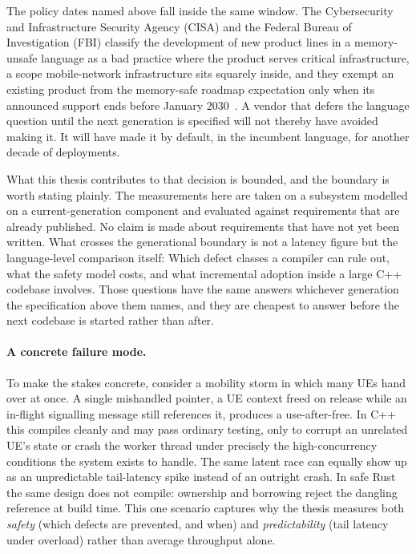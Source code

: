 \documentclass[english,oneside,a4paper,censored,csm,software-track-2020]{HYthesisML}
\begin{document}
The policy dates named above fall inside the same window. The Cybersecurity and Infrastructure
Security Agency (CISA) and the Federal Bureau of Investigation (FBI) classify the
development of new product lines in a memory-unsafe language as a bad practice where the product
serves critical infrastructure, a scope mobile-network infrastructure sits squarely inside, and
they exempt an existing product from the memory-safe roadmap expectation only when its announced
support ends before January 2030~\cite{cisa2025badpractices}. A vendor that defers the language
question until the next generation is specified will not thereby have avoided making it. It will
have made it by default, in the incumbent language, for another decade of deployments.

What this thesis contributes to that decision is bounded, and the boundary is worth stating
plainly. The measurements here are taken on a subsystem modelled on a current-generation
component and evaluated against requirements that are already published. No claim is made about
requirements that have not yet been written. What crosses the generational boundary is not a
latency figure but the language-level comparison itself: Which defect classes a compiler can rule
out, what the safety model costs, and what incremental adoption inside a large C++ codebase
involves. Those questions have the same answers whichever generation the specification above them
names, and they are cheapest to answer before the next codebase is started rather than after.

\paragraph{A concrete failure mode.}
To make the stakes concrete, consider a mobility storm in which many UEs hand over at once. A
single mishandled pointer, a UE context freed on release while an in-flight signalling message
still references it, produces a use-after-free. In C++ this compiles cleanly and may pass
ordinary testing, only to corrupt an unrelated UE's state or crash the worker thread under
precisely the high-concurrency conditions the system exists to handle. The same latent race
can equally show up as an unpredictable tail-latency spike instead of an outright crash. In
safe Rust the same design does not compile: ownership and borrowing reject the dangling
reference at build time. This one scenario captures why the thesis measures both
\emph{safety} (which defects are prevented, and when) and \emph{predictability} (tail
latency under overload) rather than average throughput alone.
\end{document}
